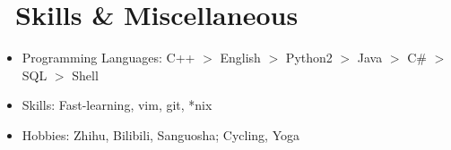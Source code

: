 \documentclass{resume}
\begin{document}

\section{\faCogs\ Skills \& Miscellaneous}
\begin{itemize}[parsep=0.5ex]
  \item Programming Languages: C++ $>$ English $>$ Python2 
          	$>$ Java $>$ C\# $>$ SQL $>$ Shell
  \item Skills: Fast-learning, vim, git, *nix
  \item Hobbies: Zhihu, Bilibili, Sanguosha; Cycling, Yoga
\end{itemize}

% 

%
%
\end{document}
